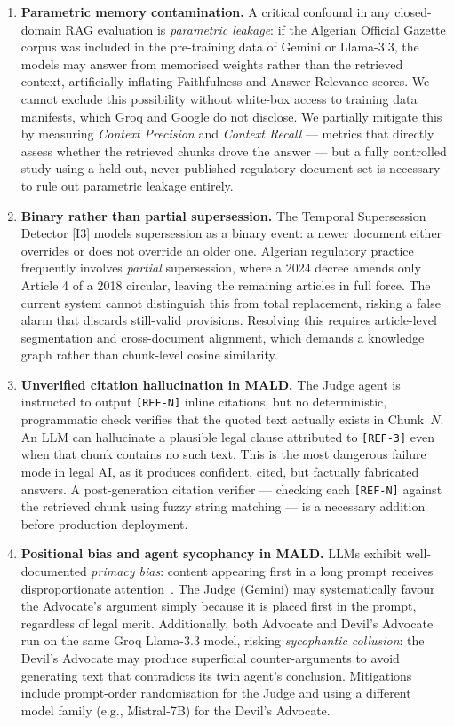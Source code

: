 \documentclass[12pt,a4paper]{article}
\begin{document}
\begin{enumerate}[leftmargin=*]

\item \textbf{Parametric memory contamination.}
A critical confound in any closed-domain RAG evaluation is \emph{parametric
leakage}: if the Algerian Official Gazette corpus was included in the pre-training
data of Gemini or Llama-3.3, the models may answer from memorised weights rather
than the retrieved context, artificially inflating Faithfulness and Answer Relevance
scores. We cannot exclude this possibility without white-box access to training data
manifests, which Groq and Google do not disclose. We partially mitigate this by
measuring \emph{Context Precision} and \emph{Context Recall} — metrics that
directly assess whether the retrieved chunks drove the answer — but a fully
controlled study using a held-out, never-published regulatory document set is
necessary to rule out parametric leakage entirely.

\item \textbf{Binary rather than partial supersession.}
The Temporal Supersession Detector [I3] models supersession as a binary
event: a newer document either overrides or does not override an older one.
Algerian regulatory practice frequently involves \emph{partial} supersession,
where a 2024 decree amends only Article 4 of a 2018 circular, leaving the
remaining articles in full force. The current system cannot distinguish this
from total replacement, risking a false alarm that discards still-valid provisions.
Resolving this requires article-level segmentation and cross-document alignment,
which demands a knowledge graph rather than chunk-level cosine similarity.

\item \textbf{Unverified citation hallucination in MALD.}
The Judge agent is instructed to output \texttt{[REF-N]} inline citations, but
no deterministic, programmatic check verifies that the quoted text actually
exists in Chunk~$N$. An LLM can hallucinate a plausible legal clause attributed
to \texttt{[REF-3]} even when that chunk contains no such text. This is the most
dangerous failure mode in legal AI, as it produces confident, cited, but factually
fabricated answers. A post-generation citation verifier — checking each
\texttt{[REF-N]} against the retrieved chunk using fuzzy string matching —
is a necessary addition before production deployment.

\item \textbf{Positional bias and agent sycophancy in MALD.}
LLMs exhibit well-documented \emph{primacy bias}: content appearing first in a
long prompt receives disproportionate attention~\cite{liu2023lost}. The Judge
(Gemini) may systematically favour the Advocate's argument simply because it
is placed first in the prompt, regardless of legal merit. Additionally, both
Advocate and Devil's Advocate run on the same Groq Llama-3.3 model, risking
\emph{sycophantic collusion}: the Devil's Advocate may produce superficial
counter-arguments to avoid generating text that contradicts its twin agent's
conclusion. Mitigations include prompt-order randomisation for the Judge and
using a different model family (e.g., Mistral-7B) for the Devil's Advocate.


\end{enumerate}
\end{document}

